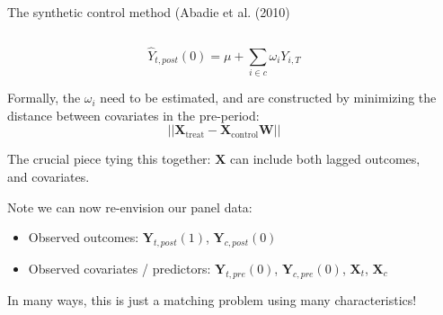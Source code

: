 \documentclass[notes,11pt, aspectratio=169]{beamer}
\newenvironment{wideitemize}{\itemize\addtolength{\itemsep}{10pt}}{\enditemize}
\begin{document}
\begin{frame}{The synthetic control method (Abadie et al. (2010)}
  \begin{columns}[T] %
    \begin{column}{0.8\textwidth}
  \begin{equation*}
    \hat{Y}_{t,post}(0) = \mu + \sum_{i \in c}\omega_{i} Y_{i, T}
  \end{equation*}
  \begin{wideitemize}
  \item Formally, the $\omega_{i}$ need to be estimated, and are
    constructed by minimizing the distance between covariates in the pre-period:
    \begin{equation*}
      ||\boldsymbol{X}_{\text{treat}} - \boldsymbol{X}_{\text{control}}\boldsymbol{W}||
    \end{equation*}
  \item The crucial piece tying this together: $\boldsymbol{X}$ can
    include both lagged outcomes, and covariates.
  \item Note we can now re-envision our panel data:
    \begin{itemize}
    \item Observed outcomes:     $\mathbf{Y}_{t,post}(1)$, $\mathbf{Y}_{c,post}(0)$
    \item Observed covariates / predictors: $\mathbf{Y}_{t,pre}(0)$, $\mathbf{Y}_{c,pre}(0)$, $\mathbf{X}_{t}$, $\mathbf{X}_{c}$
    \end{itemize}
  \item In many ways, this is just a matching problem using many characteristics!
  \end{wideitemize}
\end{column}
\begin{column}{0.4\textwidth}
\end{column}
\end{columns}
\end{frame}
\end{document}
